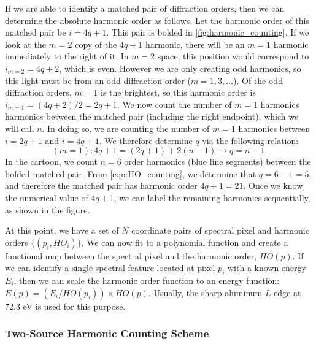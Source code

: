 If we are able to identify a matched pair of diffraction orders, then we can determine the absolute harmonic order as follows. Let the harmonic order of this matched pair be $i = 4q+1$. This pair is bolded in \cref{fig:harmonic_counting}. If we look at the $m=2$ copy of the $4q+1$ harmonic, there will be an $m=1$ harmonic immediately to the right of it. In $m=2$ space, this position would correspond to $i_{m=2} = 4q+2$, which is even. However we are only creating odd harmonics, so this light must be from an odd diffraction order ($m=1, 3, \dots$). Of the odd diffraction orders, $m=1$ is the brightest, so this harmonic order is $i_{m=1} = (4q+2)/2 = 2q+1$. We now count the number of $m=1$ harmonics harmonics between the matched pair (including the right endpoint), which we will call $n$. In doing so, we are counting the number of $m=1$ harmonics between $i=2q+1$ and $i=4q+1$. We therefore determine $q$ via the following relation:
\begin{equation}
(m=1): 4q+1 = (2q+1) + 2(n-1) \rightarrow q = n - 1.
\label{eqn:HO_counting}
\end{equation}
In the cartoon, we count $n=6$  order harmonics (blue line segments) between the bolded matched pair. From \cref{eqn:HO_counting}, we determine that $q = 6 - 1 = 5$, and therefore the matched pair has harmonic order $4q+1 = 21$. Once we know the numerical value of $4q+1$, we can label the remaining harmonics sequentially, as shown in the figure.

At this point, we have a set of $N$ coordinate pairs of spectral pixel and harmonic orders $\{(p_i, HO_i)\}$. We can now fit to a polynomial function and create a functional map between the spectral pixel and the harmonic order, $HO(p)$. If we can identify a single spectral feature located at pixel $p_i$ with a known energy $E_i$, then we can scale the harmonic order function to an energy function: $E(p) = (E_i / HO(p_i)) \times HO(p)$. Usually, the sharp aluminum $L$-edge at 72.3 eV is used for this purpose.

\subsubsection{Two-Source Harmonic Counting Scheme}


